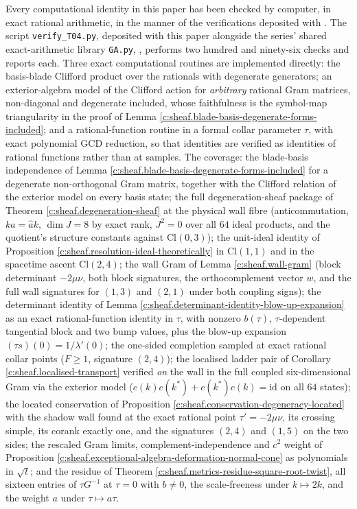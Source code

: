 \documentclass[11pt]{article}
\theoremstyle{definition}
\theoremstyle{plain}
\providecommand{\Cl}{}\renewcommand{\Cl}{\mathrm{Cl}}
\begin{document}
\label{c:note.sheaf.setting-machine-verification}
Every computational identity in this paper has been checked by computer, in exact rational arithmetic, in the manner of the verifications deposited with \cite{ButlerT1}. The script \texttt{verify\_T04.py}, deposited with this paper alongside the series' shared exact-arithmetic library \texttt{GA.py}, \cite{ButlerVerifyT04}, performs two hundred and ninety-six checks and reports each. Three exact computational routines are implemented directly: the basis-blade Clifford product over the rationals with degenerate generators; an exterior-algebra model of the Clifford action for \emph{arbitrary} rational Gram matrices, non-diagonal and degenerate included, whose faithfulness is the symbol-map triangularity in the proof of Lemma \ref{c:sheaf.blade-basis-degenerate-forms-included}; and a rational-function routine in a formal collar parameter $\tau$, with exact polynomial GCD reduction, so that identities are verified as identities of rational functions rather than at samples. The coverage: the blade-basis independence of Lemma \ref{c:sheaf.blade-basis-degenerate-forms-included} for a degenerate non-orthogonal Gram matrix, together with the Clifford relation of the exterior model on every basis state; the full degeneration-sheaf package of Theorem \ref{c:sheaf.degeneration-sheaf} at the physical wall fibre (anticommutation, $ka = \hat a k$, $\dim J = 8$ by exact rank, $J^2 = 0$ over all $64$ ideal products, and the quotient's structure constants against $\Cl(0,3)$); the unit-ideal identity of Proposition \ref{c:sheaf.resolution-ideal-theoretically} in $\Cl(1,1)$ and in the spacetime ascent $\Cl(2,4)$; the wall Gram of Lemma \ref{c:sheaf.wall-gram} (block determinant $-2\mu\nu$, both block signatures, the orthocomplement vector $w$, and the full wall signatures for $(1,3)$ and $(2,1)$ under both coupling signs); the determinant identity of Lemma \ref{c:sheaf.determinant-identity-blow-up-expansion} as an exact rational-function identity in $\tau$, with nonzero $b(\tau)$, $\tau$-dependent tangential block and two bump values, plus the blow-up expansion $(\tau s)(0) = 1/\lambda'(0)$; the one-sided completion sampled at exact rational collar points ($F \geq 1$, signature $(2,4)$); the localised ladder pair of Corollary \ref{c:sheaf.localised-transport} verified \emph{on} the wall in the full coupled six-dimensional Gram via the exterior model ($c(k)c(k^*) + c(k^*)c(k) = \mathrm{id}$ on all $64$ states); the located conservation of Proposition \ref{c:sheaf.conservation-degeneracy-located} with the shadow wall found at the exact rational point $\tau' = -2\mu\nu$, its crossing simple, its corank exactly one, and the signatures $(2,4)$ and $(1,5)$ on the two sides; the rescaled Gram limits, complement-independence and $c^2$ weight of Proposition \ref{c:sheaf.exceptional-algebra-deformation-normal-cone} as polynomials in $\sqrt t$; and the residue of Theorem \ref{c:sheaf.metrics-residue-square-root-twist}, all sixteen entries of $\tau G^{-1}$ at $\tau = 0$ with $b \neq 0$, the scale-freeness under $k \mapsto 2k$, and the weight $a$ under $\tau \mapsto a\tau$.
\end{document}
